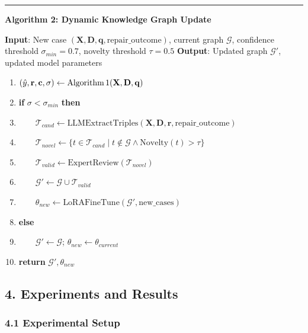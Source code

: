 \documentclass[
  11pt,
]{article}
\providecommand{\tightlist}{%
  \setlength{\itemsep}{0pt}\setlength{\parskip}{0pt}}
\begin{document}
\begin{center}\rule{0.5\linewidth}{0.5pt}\end{center}

\textbf{Algorithm 2: Dynamic Knowledge Graph Update}

\textbf{Input}: New case
\((\mathbf{X}, \mathbf{D}, \mathbf{q}, \text{repair\_outcome})\),
current graph \(\mathcal{G}\), confidence threshold
\(\sigma_{min} = 0.7\), novelty threshold \(\tau = 0.5\)
\textbf{Output}: Updated graph \(\mathcal{G}'\), updated model
parameters

\begin{enumerate}
\def\labelenumi{\arabic{enumi}.}
\tightlist
\item
  \((\hat{y}, \mathbf{r}, \mathbf{c}, \sigma) \leftarrow \text{Algorithm\,1}(\mathbf{X}, \mathbf{D}, \mathbf{q})\)
\item
  \textbf{if} \(\sigma < \sigma_{min}\) \textbf{then}
\item
  ~~~~\(\mathcal{T}_{cand} \leftarrow \text{LLMExtractTriples}(\mathbf{X}, \mathbf{D}, \mathbf{r}, \text{repair\_outcome})\)
\item
  ~~~~\(\mathcal{T}_{novel} \leftarrow \{t \in \mathcal{T}_{cand} \mid t \notin \mathcal{G} \land \text{Novelty}(t) > \tau\}\)
\item
  ~~~~\(\mathcal{T}_{valid} \leftarrow \text{ExpertReview}(\mathcal{T}_{novel})\)
\item
  ~~~~\(\mathcal{G}' \leftarrow \mathcal{G} \cup \mathcal{T}_{valid}\)
\item
  ~~~~\(\theta_{new} \leftarrow \text{LoRAFineTune}(\mathcal{G}', \text{new\_cases})\)
\item
  \textbf{else}
\item
  ~~~~\(\mathcal{G}' \leftarrow \mathcal{G}\);
  \(\theta_{new} \leftarrow \theta_{current}\)
\item
  \textbf{return} \(\mathcal{G}', \theta_{new}\)
\end{enumerate}

\newpage

\subsection{4. Experiments and Results}\label{experiments-and-results}

\subsubsection{4.1 Experimental Setup}\label{experimental-setup}
\end{document}
